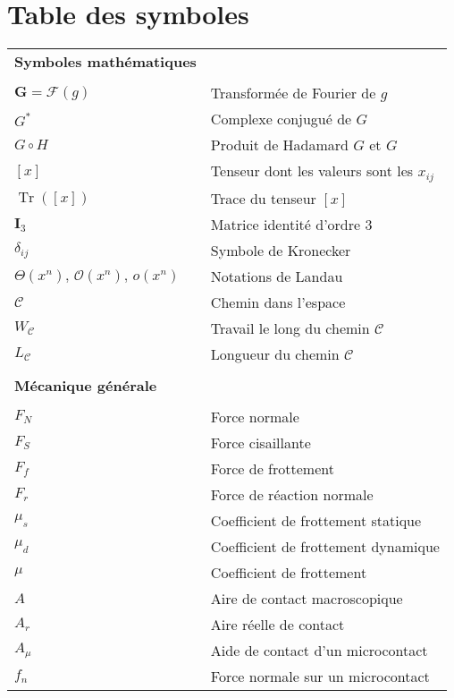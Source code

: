 \chapter*{Table des symboles}

\vspace{-1.5cm}

\begin{tabularx}{\textwidth}{lX}
\textbf{Symboles mathématiques} \\
\\
$\mathbf{G} = \mathcal{F}(g)$ & Transformée de Fourier de $g$\\
$G^*$ & Complexe conjugué de $G$\\
$G\circ H$ & Produit de Hadamard $G$ et $G$\\
$[x]$ & Tenseur dont les valeurs sont les $x_{ij}$\\
$\operatorname{Tr}([x])$ & Trace du tenseur $[x]$\\
$\mathbf{I}_3$ & Matrice identité d'ordre 3\\
$\delta_{ij}$ & Symbole de Kronecker\\
$\Theta(x^n),\,\mathcal{O}(x^n),\,o(x^n)$ & Notations de Landau\\
$\mathscr{C}$ & Chemin dans l'espace\\
$W_\mathscr{C}$ & Travail le long du chemin $\mathscr{C}$\\
$L_\mathscr{C}$ & Longueur du chemin $\mathscr{C}$\\
%
%
\\
\textbf{Mécanique générale }\\
\\
${F_N}$ & Force normale\\
${F_S}$ & Force cisaillante\\
${F_f}$ & Force de frottement\\
${F_r}$ & Force de réaction normale\\
$\mu_s$ & Coefficient de frottement statique\\
$\mu_d$ & Coefficient de frottement dynamique\\
$\mu$ & Coefficient de frottement \\
$A$ & Aire de contact macroscopique\\
$A_r$ & Aire réelle de contact\\
$A_\mu$ & Aide de contact d'un microcontact\\
$f_n$ & Force normale sur un microcontact\\

\end{tabularx}
